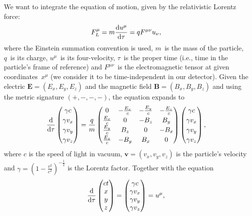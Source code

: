 		We want to integrate the equation of motion, given by the relativistic Lorentz force:
			\begin{equation}
				F^\mu_L = m\derivative{u^\mu}{\tau} = q F^{\mu\nu}u_{\nu},
			\end{equation}
		where the Einstein summation convention is used, $m$~is the mass of the particle, $q$~is its charge, $u^\mu$~is its four-velocity, $\tau$~is the proper time (i.e., time in the particle's frame of reference) and $F^{\mu\nu}$~is the electromagnetic tensor at given coordinates~$x^\mu$ (we consider it to be time-independent in our detector). Given the electric $\mathbf{E} = (E_x,E_y,E_z)$ and the magnetic field $\mathbf{B} = (B_x,B_y,B_z)$ and using the metric signature $(+,-,-,-)$, the equation expands to
			\begin{equation}
				\renewcommand{\arraystretch}{1.2}
				\derivative{}{\tau} \begin{pmatrix}\gamma c\\ \gamma v_x\\ \gamma v_y\\ \gamma v_z\end{pmatrix} = \frac{q}{m} 
				\begin{pmatrix}
					0             & -\frac{E_x}{c} & -\frac{E_y}{c} & -\frac{E_z}{c} \\
					\frac{E_x}{c} &  0             & -B_z           &  B_y           \\
					\frac{E_y}{c} &  B_z           &  0             & -B_x           \\
					\frac{E_z}{c} & -B_y           &  B_x           &  0
				\end{pmatrix}
				\begin{pmatrix}\gamma c\\ \gamma v_x\\ \gamma v_y\\ \gamma v_z\end{pmatrix},
				\renewcommand{\arraystretch}{1}
			\end{equation}
		where $c$ is the speed of light in vacuum, $\mathbf{v} = (v_x,v_y,v_z)$ is the particle's velocity and $\gamma = \left(1-\frac{v^2}{c^2}\right)^{-\frac{1}{2}}$ is the Lorentz factor. Together with the equation
			\begin{equation}
				\derivative{}{\tau} \begin{pmatrix} ct\\ x\\ y\\ z\end{pmatrix} = \begin{pmatrix}\gamma c\\ \gamma v_x\\ \gamma v_y\\ \gamma v_z\end{pmatrix} = u^\mu,
			\end{equation}
